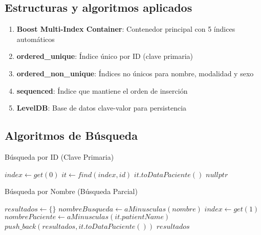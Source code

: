 \documentclass[12pt]{article}
\begin{document}
	\subsection*{Estructuras y algoritmos aplicados}
	
	\begin{enumerate}
		\item \textbf{Boost Multi-Index Container}: Contenedor principal con 5 índices automáticos
		\item \textbf{ordered\_unique}: Índice único por ID (clave primaria)
		\item \textbf{ordered\_non\_unique}: Índices no únicos para nombre, modalidad y sexo
		\item \textbf{sequenced}: Índice que mantiene el orden de inserción
		\item \textbf{LevelDB}: Base de datos clave-valor para persistencia
	\end{enumerate}
	
	\subsection*{Algoritmos de Búsqueda}
	
	\begin{algorithm}[H]
		\caption{Búsqueda por ID (Clave Primaria)}
		\begin{algorithmic}[1]
			\State $index \gets get(0)$ 
			\State $it \gets find(index, id)$
			\State \Return $it.toDataPaciente()$
			\EndIf
			\State \Return $nullptr$
			\EndFunction
		\end{algorithmic}
	\end{algorithm}
	
	\begin{algorithm}[H]
		\caption{Búsqueda por Nombre (Búsqueda Parcial)}
		\begin{algorithmic}[1]
			\State $resultados \gets \{\}$
			\State $nombreBusqueda \gets aMinusculas(nombre)$
			\State $index \gets get(1)$ 
			\State $nombrePaciente \gets aMinusculas(it.patientName)$
			\State $push\_back(resultados, it.toDataPaciente())$
			\EndIf
			\EndFor
			\State \Return $resultados$
			\EndFunction
		\end{algorithmic}
	\end{algorithm}
	
\end{document}
